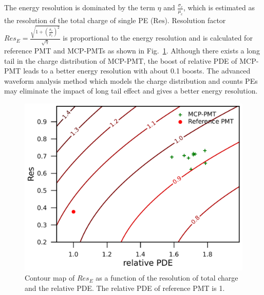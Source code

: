 The energy resolution is dominated by the term $\eta$ and $\frac{\sigma_c}{\mu_c}$, which is estimated as the resolution of the total charge of single PE ($\mathrm{Res}$). Resolution factor $Res_{E}=\frac{\sqrt{1+(\frac{\sigma_c}{\mu_c})^2}}{\sqrt{\eta}}$ is proportional to the energy resolution and is calculated for reference PMT and MCP-PMTs as shown in Fig.~\ref{fig:EnergyResolution}. Although there exists a long tail in the charge distribution of MCP-PMT, the boost of relative PDE of MCP-PMT leads to a better energy resolution with about 0.1 boosts. The advanced waveform analysis method which models the charge distribution and counts PEs may eliminate the impact of long tail effect and gives a better energy resolution.
\begin{figure}[!htbp]
    \centering
    \includegraphics[width=\MF\textwidth]{figures/result/resolution.pdf}
    \caption{Contour map of $Res_{E}$ as a function of the resolution of total charge and the relative PDE. The relative PDE of reference PMT is 1.}
    \label{fig:EnergyResolution}
\end{figure}
